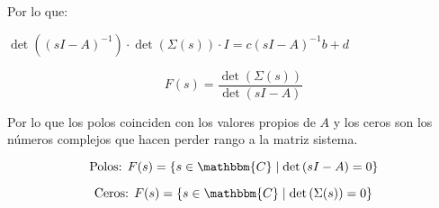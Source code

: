 \documentclass[12pt]{article}
\numberwithin{equation}{subsection}
\begin{document}
Por lo que:

\begin{math}
\det{\left( (sI - A)^{-1} \right)} \cdot \det{\left( \Sigma(s) \right)} \cdot I = c(sI - A)^{-1} b + d
\end{math}

\begin{equation}
F(s) = \frac{\det{\left( \Sigma(s) \right)}}{\det{\left( sI - A \right)}}
\end{equation}

Por lo que los polos coinciden con los valores propios de $A$ y los ceros son los números complejos que hacen perder rango a la matriz sistema.

\begin{equation}
\text{Polos: } F(s) = \left\{ s \in \mathbbm{C} \mid \det{\left( sI - A \right)} = 0 \right\}
\end{equation}

\begin{equation}
\text{Ceros: } F(s) = \left\{ s \in \mathbbm{C} \mid \det{\left( \Sigma(s) \right)} = 0 \right\}
\end{equation}
\end{document}
